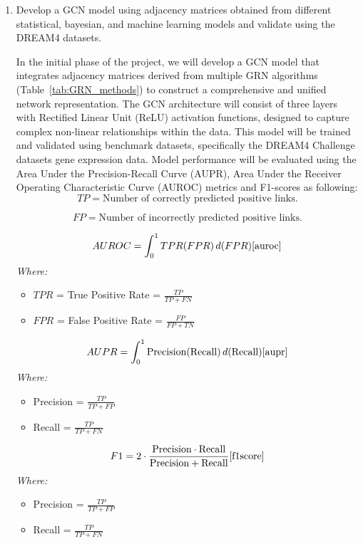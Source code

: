 \documentclass{article}
\begin{document}
\begin{enumerate}
\item Develop a GCN model using adjacency matrices obtained from different statistical, bayesian, and machine learning models and validate using the DREAM4 datasets. 

In the initial phase of the project, we will develop a GCN model that integrates adjacency matrices derived from multiple GRN algorithms (Table~\ref{tab:GRN_methods}) to construct a comprehensive and unified network representation. The GCN architecture will consist of three layers with Rectified Linear Unit (ReLU) activation functions, designed to capture complex non-linear relationships within the data. This model will be trained and validated using benchmark datasets, specifically the DREAM4 Challenge datasets gene expression data. Model performance will be evaluated using the Area Under the Precision-Recall Curve (AUPR), Area Under the Receiver Operating Characteristic Curve (AUROC) metrics and F1-scores as following:
\[
TP = \text{Number of correctly predicted positive links.}
\]

\[
FP = \text{Number of incorrectly predicted positive links.}
\]

\[
AUROC = \int_{0}^{1} TPR(FPR) \, d(FPR) \cite{auroc}
\]
\textit{Where:}
\begin{itemize}
    \item $TPR$ = True Positive Rate = $\frac{TP}{TP + FN}$
    \item $FPR$ = False Positive Rate = $\frac{FP}{FP + TN}$
\end{itemize}

\[
AUPR = \int_{0}^{1} \text{Precision(Recall)} \, d(\text{Recall}) \cite{aupr}
\]
\textit{Where:}
\begin{itemize}
    \item Precision = $\frac{TP}{TP + FP}$
    \item Recall = $\frac{TP}{TP + FN}$
\end{itemize}

\[
F1 = 2 \cdot \frac{\text{Precision} \cdot \text{Recall}}{\text{Precision} + \text{Recall}} \cite{f1score}
\]
\textit{Where:}
\begin{itemize}
    \item Precision = $\frac{TP}{TP + FP}$
    \item Recall = $\frac{TP}{TP + FN}$
\end{itemize}


\end{enumerate}
\end{document}
